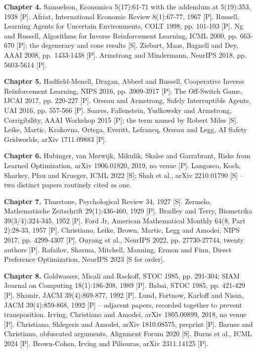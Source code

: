 \textbf{Chapter 4.} Samuelson, Economica 5(17):61-71 with the addendum at 5(19):353, 1938 [P]. Afriat, International Economic Review 8(1):67-77, 1967 [P]. Russell, Learning Agents for Uncertain Environments, COLT 1998, pp. 101-103 [P]. Ng and Russell, Algorithms for Inverse Reinforcement Learning, ICML 2000, pp. 663-670 [P]; the degeneracy and cone results [S]. Ziebart, Maas, Bagnell and Dey, AAAI 2008, pp. 1433-1438 [P]. Armstrong and Mindermann, NeurIPS 2018, pp. 5603-5614 [P].

\textbf{Chapter 5.} Hadfield-Menell, Dragan, Abbeel and Russell, Cooperative Inverse Reinforcement Learning, NIPS 2016, pp. 3909-3917 [P]; The Off-Switch Game, IJCAI 2017, pp. 220-227 [P]. Orseau and Armstrong, Safely Interruptible Agents, UAI 2016, pp. 557-566 [P]. Soares, Fallenstein, Yudkowsky and Armstrong, Corrigibility, AAAI Workshop 2015 [P]; the term named by Robert Miles [S]. Leike, Martic, Krakovna, Ortega, Everitt, Lefrancq, Orseau and Legg, AI Safety Gridworlds, arXiv 1711.09883 [P].

\textbf{Chapter 6.} Hubinger, van Merwijk, Mikulik, Skalse and Garrabrant, Risks from Learned Optimization, arXiv 1906.01820, 2019, no venue [P]. Langosco, Koch, Sharkey, Pfau and Krueger, ICML 2022 [S]; Shah et al., arXiv 2210.01790 [S] -- two distinct papers routinely cited as one.

\textbf{Chapter 7.} Thurstone, Psychological Review 34, 1927 [S]. Zermelo, Mathematische Zeitschrift 29(1):436-460, 1929 [P]. Bradley and Terry, Biometrika 39(3/4):324-345, 1952 [P]. Ford Jr, American Mathematical Monthly 64(8, Part 2):28-33, 1957 [P]. Christiano, Leike, Brown, Martic, Legg and Amodei, NIPS 2017, pp. 4299-4307 [P]. Ouyang et al., NeurIPS 2022, pp. 27730-27744, twenty authors [P]. Rafailov, Sharma, Mitchell, Manning, Ermon and Finn, Direct Preference Optimization, NeurIPS 2023 [S for order].

\textbf{Chapter 8.} Goldwasser, Micali and Rackoff, STOC 1985, pp. 291-304; SIAM Journal on Computing 18(1):186-208, 1989 [P]. Babai, STOC 1985, pp. 421-429 [P]. Shamir, JACM 39(4):869-877, 1992 [P]. Lund, Fortnow, Karloff and Nisan, JACM 39(4):859-868, 1992 [P] -- adjacent papers, recorded together to prevent transposition. Irving, Christiano and Amodei, arXiv 1805.00899, 2018, no venue [P]. Christiano, Shlegeris and Amodei, arXiv 1810.08575, preprint [P]. Barnes and Christiano, obfuscated arguments, Alignment Forum 2020 [S]. Burns et al., ICML 2024 [P]. Brown-Cohen, Irving and Piliouras, arXiv 2311.14125 [P].

